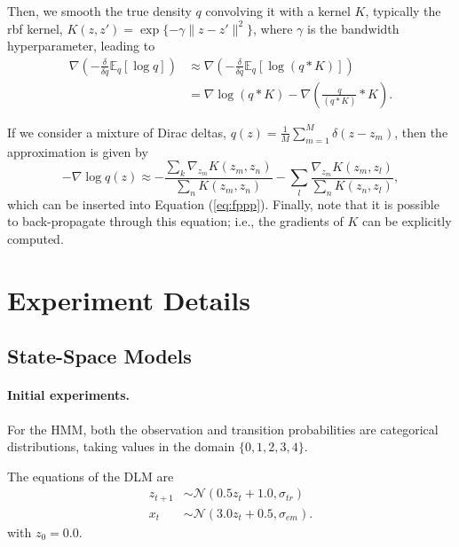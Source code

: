 Then, we smooth the true density $q$ convolving it with a kernel $K$, typically the rbf %
kernel, $K(z, z') = \exp \lbrace - \gamma \| z - z' \|^2 \rbrace$, where $\gamma$ is the bandwidth hyperparameter, leading to
\begin{align*}
    \nabla \left( - \frac{\delta}{\delta q} \mathbb{E}_q \left[ \log q\right] \right) &\approx
     \nabla \left( - \frac{\delta}{\delta q} \mathbb{E}_q \left[ \log (q\ast K )\right] \right) \\
     &= \nabla \log (q \ast K) - \nabla \left( \frac{q}{(q \ast K)} \ast K \right).
\end{align*}

If we consider a mixture of Dirac deltas, $q(z) = \frac{1}{M} \sum_{m=1}^M \delta(z - z_m)$, then the approximation is given 
by
$$
- \nabla \log q(z) \approx - \frac{\sum_k \nabla_{z_m} K(z_m, z_n)}{\sum_n K(z_m, z_n)}
- \sum_l \frac{\nabla_{z_m} K(z_m, z_l)}{\sum_n K(z_n, z_l)},
$$
which can be inserted into Equation (\ref{eq:fppp}). Finally, note that
it is possible to back-propagate through this equation; i.e., the gradients of $K$ can be explicitly computed.

\section{Experiment Details}\label{sec:detail}


\subsection{State-Space Models}\label{app:ss}

\paragraph{Initial experiments.}\label{app:hmm}
For the HMM, both the observation and transition probabilities are categorical distributions, taking values in the domain $\lbrace 0, 1, 2, 3, 4 \rbrace$.

The equations of the DLM are 
\begin{align*}
    z_{t+1} &\sim \mathcal{N}(0.5z_t + 1.0,\sigma_{tr}) \\
    x_{t} &\sim \mathcal{N}(3.0z_t + 0.5, \sigma_{em}).
\end{align*}
with $z_0  = 0.0$.


